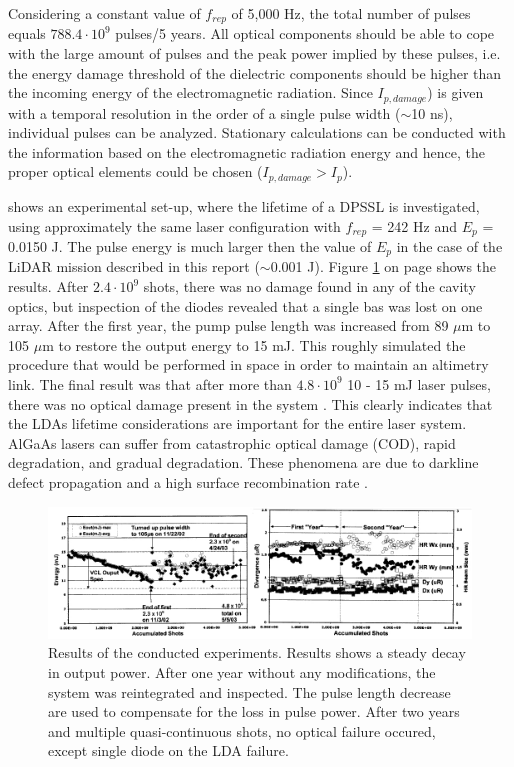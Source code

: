 Considering a constant value of $f_{rep}$ of 5,000 Hz, the total number of pulses equals $788.4\cdot10^{9}$ pulses/5 years. All optical components should be able to cope with the large amount of pulses and the peak power implied by these pulses, i.e. the energy damage threshold of the dielectric components should be higher than the incoming energy of the electromagnetic radiation. Since $I_{p,damage}$) is given with a temporal resolution in the order of a single pulse width ($\sim$10 ns), individual pulses can be analyzed. Stationary calculations can be conducted with the information based on the electromagnetic radiation energy and hence, the proper optical elements could be chosen ($I_{p,damage} > I_{p}$).

\cite{nd_yag_life} shows an experimental set-up, where the lifetime of a \acs{DPSSL} is investigated, using approximately the same \acs{laser} configuration with $f_{rep}$ = 242 Hz and $E_{p}$ = 0.0150 J. The pulse energy is much larger then the value of $E_{p}$ in the case of the \acs{LiDAR} mission described in this report ($\sim$0.001 J). Figure \ref{fig:ndyag_reliability} on page \pageref{fig:ndyag_reliability} shows the results. After $2.4\cdot10^{9}$ shots, there was no damage found in any of the cavity optics, but inspection of the diodes revealed that a single bas was lost on one array. After the first year, the pump pulse length was increased from 89 $\mu$m to 105 $\mu$m to restore the output energy to 15 mJ. This roughly simulated the procedure that would be performed in space in order to maintain an altimetry link. The final result was that after more than $4.8\cdot10^{9}$ 10 - 15 mJ laser pulses, there was no optical damage present in the system \cite{nd_yag_life}. This clearly indicates that the \acp{LDA} lifetime considerations are important for the entire \acs{laser} system. AlGaAs lasers can suffer from catastrophic optical damage (COD), rapid degradation, and gradual degradation. These phenomena are due to darkline defect propagation and a high surface recombination rate \cite{algaas}.

\begin{figure}[ht!]
\centering
\includegraphics[scale=0.5]{chapters/img/Nd-YAG_reliability.jpg} 
\caption[Results of the conducted experiments]{Results of the conducted experiments. Results shows a steady decay in output power. After one year without any modifications, the system was reintegrated and inspected. The pulse length decrease are used to compensate for the loss in pulse power. After two years and multiple quasi-continuous shots, no optical failure occured, except single diode on the \acs{LDA} failure.}
\label{fig:ndyag_reliability}
\end{figure}

